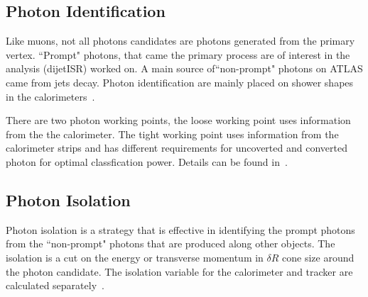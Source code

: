 \subsection{Photon Identification}
Like muons, not all photons candidates are photons generated from the primary vertex. ``Prompt" photons, that came the primary process are of interest in the analysis (dijetISR) worked on. A main source of``non-prompt" photons on ATLAS came from jets decay. Photon identification are mainly placed on shower shapes in the calorimeters~\cite{gammaCalibration2019}.

There are two photon working points, the loose working point uses information from the the calorimeter. The tight working point uses information from the calorimeter strips and has different requirements for uncoverted and converted photon for optimal classfication power. Details can be found in~\cite{gammaCalibration2019}. 

\subsection{Photon Isolation}
Photon isolation is a strategy that is effective in identifying the prompt photons from the ``non-prompt" photons that are produced along other objects. The isolation is a cut on the energy or transverse momentum in $\delta R $ cone size around the photon candidate. The isolation variable for the calorimeter and tracker are calculated separately~\cite{gammaCalibration2019}.

%
%


